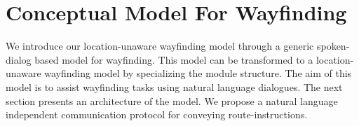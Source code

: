\documentclass{iitkthesis}
\begin{document}
 \chapter{Conceptual Model For Wayfinding}
We introduce our location-unaware wayfinding model through a generic 
spoken-dialog based model for wayfinding. This model can be transformed 
to a location-unaware wayfinding model by specializing the module 
structure. The aim of this model is to assist wayfinding tasks using 
natural language dialogues. The next section presents an architecture of 
the model. We propose a natural language independent communication 
protocol for conveying route-instructions.
\end{document}
